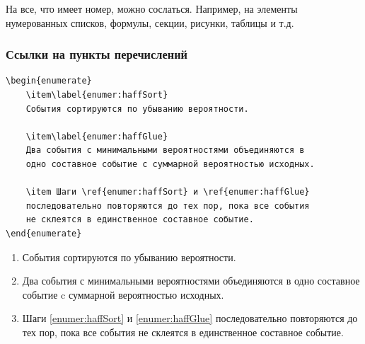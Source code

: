 На все, что имеет номер, можно сослаться. Например, на элементы нумерованных списков, формулы, секции, рисунки, таблицы и т.д.

\begin{frame}
\frametitle{Ссылки на пункты перечислений}
\begin{example}[Содержание]
\begin{verbatim}
\begin{enumerate}
    \item\label{enumer:haffSort} 
    События сортируются по убыванию вероятности.
    
    \item\label{enumer:haffGlue} 
    Два события с минимальными вероятностями объединяются в 
    одно составное событие c суммарной вероятностью исходных.
    
    \item Шаги \ref{enumer:haffSort} и \ref{enumer:haffGlue} 
    последовательно повторяются до тех пор, пока все события 
    не склеятся в единственное составное событие.
\end{enumerate}
\end{verbatim}
\end{example}

\begin{example}[Форма]
\begin{enumerate}
    \item\label{enumer:haffSort} 
    События сортируются по убыванию вероятности.
    
    \item\label{enumer:haffGlue} 
    Два события с минимальными вероятностями объединяются 
    в одно составное событие c суммарной вероятностью исходных.
    
    \item Шаги \ref{enumer:haffSort} и \ref{enumer:haffGlue} 
    последовательно повторяются до тех пор, пока все события 
    не склеятся в единственное составное событие.
\end{enumerate}
\end{example}
\end{frame}


